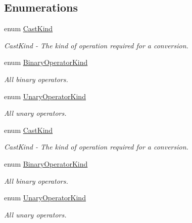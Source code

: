 \subsection*{Enumerations}
\begin{DoxyCompactItemize}
\item 
\mbox{\label{namespacespan_1_1ir_1_1op_a04abe430db9937e27dc5df909415002b}} 
enum \hyperlink{namespacespan_1_1ir_1_1op_a04abe430db9937e27dc5df909415002b}{Cast\+Kind} \begin{DoxyCompactList}\small\item\em Cast\+Kind -\/ The kind of operation required for a conversion. \end{DoxyCompactList}
\item 
\mbox{\label{namespacespan_1_1ir_1_1op_a5741ac4595bea9e1d2821a8bb5d953e3}} 
enum \hyperlink{namespacespan_1_1ir_1_1op_a5741ac4595bea9e1d2821a8bb5d953e3}{Binary\+Operator\+Kind} \begin{DoxyCompactList}\small\item\em All binary operators. \end{DoxyCompactList}
\item 
\mbox{\label{namespacespan_1_1ir_1_1op_ab88ceb1213c3473d4f5fc848509dd181}} 
enum \hyperlink{namespacespan_1_1ir_1_1op_ab88ceb1213c3473d4f5fc848509dd181}{Unary\+Operator\+Kind} \begin{DoxyCompactList}\small\item\em All unary operators. \end{DoxyCompactList}
\item 
\mbox{\label{namespacespan_1_1ir_1_1op_a04abe430db9937e27dc5df909415002b}} 
enum \hyperlink{namespacespan_1_1ir_1_1op_a04abe430db9937e27dc5df909415002b}{Cast\+Kind} \begin{DoxyCompactList}\small\item\em Cast\+Kind -\/ The kind of operation required for a conversion. \end{DoxyCompactList}
\item 
\mbox{\label{namespacespan_1_1ir_1_1op_a5741ac4595bea9e1d2821a8bb5d953e3}} 
enum \hyperlink{namespacespan_1_1ir_1_1op_a5741ac4595bea9e1d2821a8bb5d953e3}{Binary\+Operator\+Kind} \begin{DoxyCompactList}\small\item\em All binary operators. \end{DoxyCompactList}
\item 
\mbox{\label{namespacespan_1_1ir_1_1op_ab88ceb1213c3473d4f5fc848509dd181}} 
enum \hyperlink{namespacespan_1_1ir_1_1op_ab88ceb1213c3473d4f5fc848509dd181}{Unary\+Operator\+Kind} \begin{DoxyCompactList}\small\item\em All unary operators. \end{DoxyCompactList}
\end{DoxyCompactItemize}
